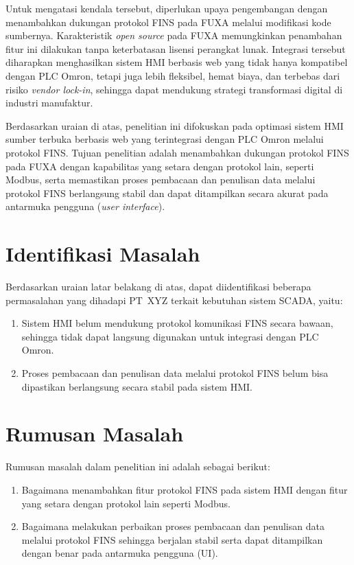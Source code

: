 Untuk mengatasi kendala tersebut, diperlukan upaya pengembangan dengan menambahkan dukungan protokol FINS pada FUXA melalui modifikasi kode sumbernya. Karakteristik \textit{open source} pada FUXA memungkinkan penambahan fitur ini dilakukan tanpa keterbatasan lisensi perangkat lunak. Integrasi tersebut diharapkan menghasilkan sistem HMI berbasis web yang tidak hanya kompatibel dengan PLC Omron, tetapi juga lebih fleksibel, hemat biaya, dan terbebas dari risiko \textit{vendor lock-in}, sehingga dapat mendukung strategi transformasi digital di industri manufaktur.

Berdasarkan uraian di atas, penelitian ini difokuskan pada optimasi sistem HMI sumber terbuka berbasis web yang terintegrasi dengan PLC Omron melalui protokol FINS. Tujuan penelitian adalah menambahkan dukungan protokol FINS pada FUXA dengan kapabilitas yang setara dengan protokol lain, seperti Modbus, serta memastikan proses pembacaan dan penulisan data melalui protokol FINS berlangsung stabil dan dapat ditampilkan secara akurat pada antarmuka pengguna (\textit{user interface}).


\section{Identifikasi Masalah}

Berdasarkan uraian latar belakang di atas, dapat diidentifikasi beberapa permasalahan yang dihadapi PT~XYZ terkait kebutuhan sistem SCADA, yaitu:
\begin{enumerate}
    \item Sistem HMI belum mendukung protokol komunikasi FINS secara bawaan, sehingga tidak dapat langsung digunakan untuk integrasi dengan PLC Omron.
    \item Proses pembacaan dan penulisan data melalui protokol FINS belum bisa dipastikan berlangsung secara stabil pada sistem HMI.
\end{enumerate}


\section{Rumusan Masalah}
Rumusan masalah dalam penelitian ini adalah sebagai berikut:
\begin{enumerate}
    \item Bagaimana menambahkan fitur protokol FINS pada sistem HMI dengan fitur yang setara dengan protokol lain seperti Modbus.
    \item Bagaimana melakukan perbaikan proses pembacaan dan penulisan data melalui protokol FINS sehingga berjalan stabil serta dapat ditampilkan dengan benar pada antarmuka pengguna (UI).
\end{enumerate}

